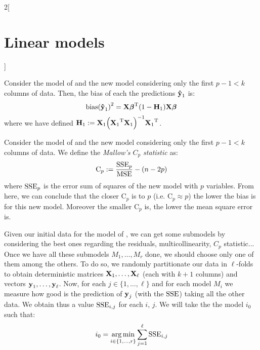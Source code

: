 \documentclass[../../../main_math.tex]{subfiles}
\begin{document}
\begin{multicols}{2}[\section{Linear models}]
\begin{proposition}
    Consider the model of  and the new model considering only the first $p-1<k$ columns of data. Then, the bias of each the predictions $\boldsymbol{\mathrm{\hat{y}}}_1$ is: $${\operatorname{bias}(\boldsymbol{\mathrm{\hat{y}}}_1)}^2={\boldsymbol{\mathrm{X}}\boldsymbol{\mathrm{\beta}}}^{\mathrm{T}}(1-\boldsymbol{\mathrm{H}}_1)\boldsymbol{\mathrm{X\beta}}$$
    where we have defined $\boldsymbol{\mathrm{H}}_1:=\boldsymbol{\mathrm{X}}_1{\left({\boldsymbol{\mathrm{X}}_1}^{\mathrm{T}}\boldsymbol{\mathrm{X}}_1\right)}^{-1}{\boldsymbol{\mathrm{X}}_1}^{\mathrm{T}}$.
  \end{proposition}
  \begin{theorem}
    Consider the model of  and the new model considering only the first $p-1<k$ columns of data. We define the \emph{Mallow's $C_p$ statistic} as: $$\mathrm{C}_p:=\frac{\operatorname{SSE}_p}{\operatorname{MSE}}-(n-2p)$$
    where $\operatorname{SSE}_p$ is the error sum of squares of the new model with $p$ variables.
    From here, we can conclude that the closer $\mathrm{C}_p$ is to $p$ (i.e. $\mathrm{C}_p\approx p$) the lower the bias is for this new model. Moreover the smaller $\mathrm{C}_p$ is, the lower the mean square error is.
  \end{theorem}
  \begin{remark}
    Given our initial data for the model of , we can get some submodels by considering the best ones regarding the residuals, multicollinearity, $C_p$ statistic... Once we have all these submodels $M_1,\ldots,M_r$ done, we should choose only one of them among the others. To do so, we randomly partitionate our data in $\ell$-folds to obtain deterministic matrices $\boldsymbol{\mathrm{X}}_{1},\ldots,\boldsymbol{\mathrm{X}}_\ell$ (each with $k+1$ columns) and vectors $\boldsymbol{\mathrm{y}}_1,\ldots,\boldsymbol{\mathrm{y}}_\ell$. Now, for each $j\in\{1,\ldots, \ell\}$ and for each model $M_i$ we measure how good is the prediction of $\boldsymbol{\mathrm{y}}_j$ (with the $\operatorname{SSE}$) taking all the other data. We obtain thus a value $\operatorname{SSE}_{i,j}$ for each $i$, $j$. We will take the the model $i_0$ such that: $$i_0=\operatorname*{arg\,min}_{i\in\{1,\ldots,r\}}\sum_{j=1}^{\ell}\operatorname{SSE}_{i,j}$$
  \end{remark}

\end{multicols}
\end{document}
